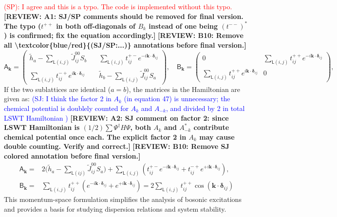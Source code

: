 \documentclass[aps, prx, nofootinbib, superscriptaddress]{revtex4-2}
\newcommand{\REVIEW}[1]{{\color{reviewcolor}\bfseries [REVIEW: #1]}}
\begin{document}
\textcolor{red}{ (SP):
    I agree and this is a typo. The code is implemented without this typo.
}
\REVIEW{A1: SJ/SP comments should be removed for final version. The typo ($t^{++}$ in both off-diagonals of $B_k$ instead of one being $(t^{--})^*$) is confirmed; fix the equation accordingly.}
\REVIEW{B10: Remove all \textbackslash textcolor\{blue/red\}\{(SJ/SP:...)\} annotations before final version.}
\begin{equation}
    \mathsf{A}_{\mathbf{k}} = 
    \begin{pmatrix}
        \widetilde{h}_{a} - \sum_{\mathsf{L}(i,j)} \widetilde{J}_{ij}^{00} S_{b} \quad
        & \sum_{\mathsf{L}(i,j)}t^{+-}_{ij} e^{-i \mathbf{k} \cdot \bm{\delta}_{ij}} \\[0.5em]
        \sum_{\mathsf{L}(i,j)}t^{-+}_{ij} e^{i \mathbf{k} \cdot \bm{\delta}_{ij}} \quad &
        \widetilde{h}_{b} - \sum_{\mathsf{L}(i,j)} \widetilde{J}_{ij}^{00} S_{a}
    \end{pmatrix},
    \quad  \mathsf{B}_{\mathbf{k}} =
    \begin{pmatrix}
        0   & \sum_{\mathsf{L}(i,j)}t^{++}_{ij} e^{-i \mathbf{k} \cdot \bm{\delta}_{ij}} \\[0.5em]
        \sum_{\mathsf{L}(i,j)}t^{++}_{ij} e^{i \mathbf{k} \cdot \bm{\delta}_{ij}} &    0
    \end{pmatrix},
\end{equation}
If the two sublattices are identical ($a = b$), the matrices in the Hamiltonian are given as: \textcolor{blue}{(SJ: I think the factor 2 in $A_k$ (in equation 47) is unnecessary; the chemical potential is doublely counted for $A_k$ and $A_{-k}$, and divided by 2 in total LSWT Hamiltonian )}
\REVIEW{A2: SJ comment on factor 2: since LSWT Hamiltonian is $(1/2)\sum \Psi^\dagger H \Psi$, both $A_k$ and $A_{-k}^*$ contribute chemical potential once each. The explicit factor 2 in $A_k$ may cause double counting. Verify and correct.}
\REVIEW{B10: Remove SJ colored annotation before final version.}
\begin{equation}
    \begin{split}
        \mathsf{A}_{\mathbf{k}} 
        = & 2 \Big( \widetilde{h}_{a} - \sum_{\mathsf{L}(ij)} \widetilde{J}_{ij}^{00} S_{a} \Big)
        + \sum_{\mathsf{L}(i,j)}(t_{ij}^{+-} e^{-i \mathbf{k} \cdot \bm{\delta}_{ij}} + t^{-+}_{ij} e^{+i \mathbf{k} \cdot \bm{\delta}_{ij}}), \\
        \mathsf{B}_{\mathbf{k}} 
        = & \sum_{\mathsf{L}(i,j)}t^{++}_{ij} (e^{-i \mathbf{k} \cdot \bm{\delta}_{ij}} + e^{+i \mathbf{k} \cdot \bm{\delta}_{ij}})
        = 2 \sum_{\mathsf{L}(i,j)}t^{++}_{ij} \cos ( \mathbf{k} \cdot \bm{\delta}_{ij}) 
    \end{split}
\end{equation}
This momentum-space formulation simplifies the analysis of bosonic excitations and provides a basis for studying dispersion relations and system stability.
\end{document}
